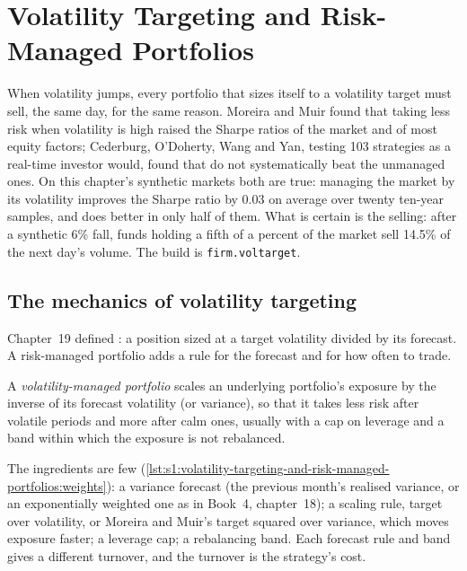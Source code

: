 \chapter{Volatility Targeting and Risk-Managed Portfolios}\label{ch:s1:volatility-targeting-and-risk-managed-portfolios}

When volatility jumps, every portfolio that sizes itself to a volatility target must sell, the same day, for the same reason. Moreira and Muir found
that taking less risk when volatility is high raised the Sharpe ratios of the market and of most equity factors; Cederburg, O'Doherty, Wang and Yan,
testing 103 strategies as a real-time investor would, found that  do not systematically beat the unmanaged ones. On this
chapter's synthetic markets both are true: managing the market by its volatility improves the Sharpe ratio by 0.03 on average over twenty
ten-year samples, and does better in only half of them. What is certain is the selling: after a synthetic 6\% fall, funds holding a fifth of a percent
of the market sell 14.5\% of the next day's volume. The build is \texttt{firm.voltarget}.

\section{The mechanics of volatility targeting}

Chapter~19 defined : a position sized at a target volatility divided by its forecast. A risk-managed portfolio adds a rule for the
forecast and for how often to trade.

\begin{definition}\label{def:s1:volatility-targeting-and-risk-managed-portfolios:managed}
A \emph{volatility-managed portfolio} scales an underlying portfolio's exposure by the inverse of its forecast
volatility (or variance), so that it takes less risk after volatile periods and more after calm ones, usually with a cap on leverage and a band within
which the exposure is not rebalanced.
\end{definition}

The ingredients are few (\cref{lst:s1:volatility-targeting-and-risk-managed-portfolios:weights}): a variance forecast (the previous month's realised
variance, or an exponentially weighted one as in Book~4, chapter~18); a scaling rule, target over volatility, or Moreira and Muir's target squared over
variance, which moves exposure faster; a leverage cap; a rebalancing band. Each forecast rule and band gives a different turnover, and the turnover is
the strategy's cost.

